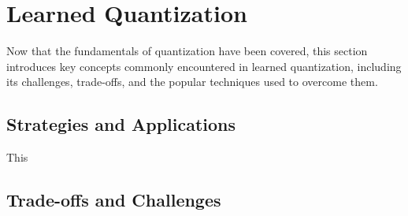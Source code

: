 
\section{Learned Quantization}
\label{sec:section3}
Now that the fundamentals of quantization have been covered, 
this section introduces key concepts commonly encountered in learned quantization,
including its challenges, trade-offs, and the popular techniques used to overcome them.

\subsection{Strategies and Applications}
\label{subsec:subsection1}
This

\subsection{Trade-offs and Challenges}
\label{subsec:subsection2}

%
%

